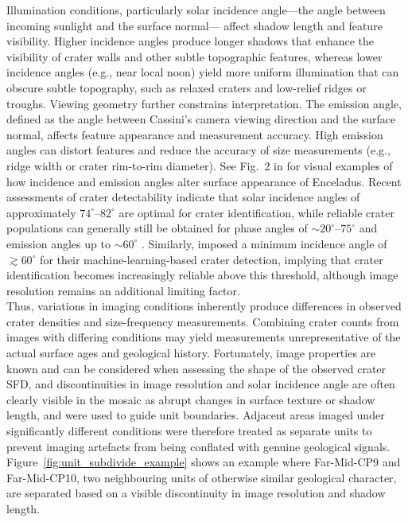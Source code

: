 \documentclass[preprint,11pt,3p,times,authoryear]{elsarticle}
\begin{document}
Illumination conditions, particularly solar incidence angle—the angle between incoming sunlight and the surface normal— affect shadow length and feature visibility. 
Higher incidence angles produce longer shadows that enhance the visibility of crater walls and other subtle topographic features, whereas lower incidence angles (e.g., near local noon) yield more uniform illumination that can obscure subtle topography, such as relaxed craters and low-relief ridges or troughs.
Viewing geometry further constrains interpretation. The emission angle, defined as the angle between Cassini's camera viewing direction and the surface normal, affects feature appearance and measurement accuracy. High emission angles can distort features and reduce the accuracy of size measurements (e.g., ridge width or crater rim-to-rim diameter). See Fig.~2 in \citet{Bland2018} for visual examples of how incidence and emission angles alter surface appearance of Enceladus.
Recent assessments of crater detectability indicate that solar incidence angles of approximately $74^{\circ}$--$82^{\circ}$ are optimal for crater identification, while reliable crater populations can generally still be obtained for phase angles of $\sim20^{\circ}$--$75^{\circ}$ and emission angles up to $\sim60^{\circ}$ \citep{Robbins2025}. Similarly, \citet{Blanco-Rojas2024} imposed a minimum incidence angle of $\gtrsim60^{\circ}$ for their machine-learning-based crater detection, implying that crater identification becomes increasingly reliable above this threshold, although image resolution remains an additional limiting factor.\\

Thus, variations in imaging conditions inherently produce differences in observed crater densities and size-frequency measurements. Combining crater counts from images with differing conditions may yield measurements unrepresentative of the actual surface ages and geological history. Fortunately, image properties are known and can be considered when assessing the shape of the observed crater SFD, and discontinuities in image resolution and solar incidence angle are often clearly visible in the mosaic as abrupt changes in surface texture or shadow length, and were used to guide unit boundaries.
Adjacent areas imaged under significantly different conditions were therefore treated as separate units to prevent imaging artefacts from being conflated with genuine geological signals. 
Figure~\ref{fig:unit_subdivide_example} shows an example where Far-Mid-CP9 and Far-Mid-CP10, two neighbouring units of otherwise similar geological character, are separated based on a visible discontinuity in image resolution and shadow length.
\end{document}
